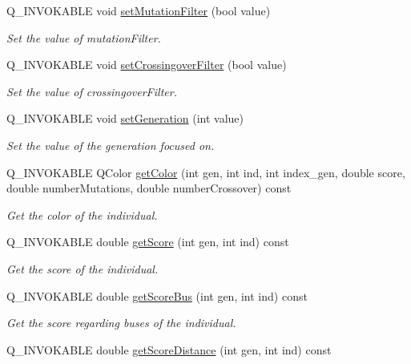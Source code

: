 \begin{DoxyCompactItemize}
Q\+\_\+\+I\+N\+V\+O\+K\+A\+B\+LE void \hyperlink{class_generation_table_model_a0f1f2b72d9b75df22bc6c1ac3156be2f}{set\+Mutation\+Filter} (bool value)
\begin{DoxyCompactList}\small\item\em Set the value of mutation\+Filter. \end{DoxyCompactList}\item 
Q\+\_\+\+I\+N\+V\+O\+K\+A\+B\+LE void \hyperlink{class_generation_table_model_aa53056b850a7ca6f77deb5bdf312e52e}{set\+Crossingover\+Filter} (bool value)
\begin{DoxyCompactList}\small\item\em Set the value of crossingover\+Filter. \end{DoxyCompactList}\item 
Q\+\_\+\+I\+N\+V\+O\+K\+A\+B\+LE void \hyperlink{class_generation_table_model_ad288b648745cacc9c46aee376e0c6dda}{set\+Generation} (int value)
\begin{DoxyCompactList}\small\item\em Set the value of the generation focused on. \end{DoxyCompactList}\item 
Q\+\_\+\+I\+N\+V\+O\+K\+A\+B\+LE Q\+Color \hyperlink{class_generation_table_model_acbabf3965bbf7c7ce037f62d38a18ada}{get\+Color} (int gen, int ind, int index\+\_\+gen, double score, double number\+Mutations, double number\+Crossover) const
\begin{DoxyCompactList}\small\item\em Get the color of the individual. \end{DoxyCompactList}\item 
Q\+\_\+\+I\+N\+V\+O\+K\+A\+B\+LE double \hyperlink{class_generation_table_model_a4a5fc6202b2110ab2cfe69bf482f7c33}{get\+Score} (int gen, int ind) const
\begin{DoxyCompactList}\small\item\em Get the score of the individual. \end{DoxyCompactList}\item 
Q\+\_\+\+I\+N\+V\+O\+K\+A\+B\+LE double \hyperlink{class_generation_table_model_ac6ba8b04c5cdc79b3611090045c82be2}{get\+Score\+Bus} (int gen, int ind) const
\begin{DoxyCompactList}\small\item\em Get the score regarding buses of the individual. \end{DoxyCompactList}\item 
Q\+\_\+\+I\+N\+V\+O\+K\+A\+B\+LE double \hyperlink{class_generation_table_model_a4c8dec508fc7f18ea5dcc1d609cd01c8}{get\+Score\+Distance} (int gen, int ind) const

\end{DoxyCompactItemize}
